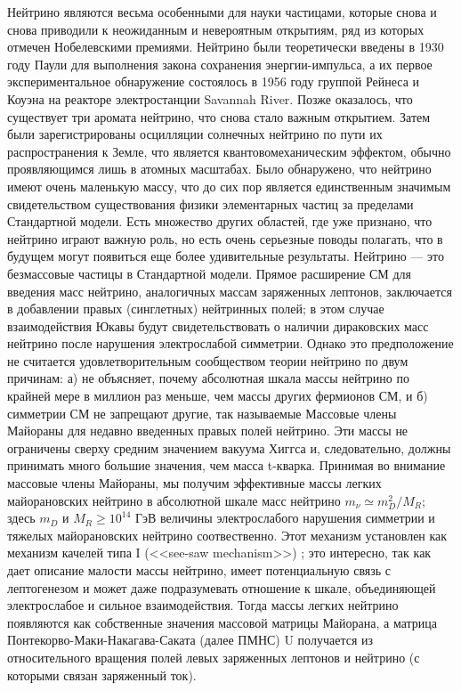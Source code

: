 ﻿\documentclass[a4paper,14pt]{extarticle}
\begin{document}
    Нейтрино являются весьма особенными для науки частицами, которые снова и снова 
    приводили к неожиданным и невероятным открытиям, ряд из которых отмечен Нобелевскими 
    премиями. Нейтрино были теоретически введены в 1930 году Паули для выполнения закона сохранения 
    энергии-импульса, а их первое экспериментальное обнаружение состоялось в 1956 году 
    группой Рейнеса и Коуэна на реакторе электростанции Savannah River. Позже оказалось, что существует три аромата нейтрино,
    что снова стало важным открытием. Затем были зарегистрированы осцилляции солнечных 
    нейтрино по пути их распространения к Земле, что является квантовомеханическим эффектом,
    обычно проявляющимся лишь в атомных масштабах. Было обнаружено, что нейтрино имеют 
    очень маленькую массу, что до сих пор является единственным значимым свидетельством
    существования физики элементарных частиц за пределами Стандартной модели. Есть множество других областей, где уже признано, 
    что нейтрино играют важную роль, но есть очень серьезные поводы полагать, что в будущем 
    могут появиться еще более удивительные результаты. Нейтрино — это безмассовые частицы в 
    Стандартной модели. Прямое расширение СМ для введения масс нейтрино, аналогичных массам 
    заряженных лептонов, заключается в добавлении правых (синглетных) нейтринных полей; в этом 
    случае  взаимодействия Юкавы будут свидетельствовать о наличии дираковских масс нейтрино 
    после нарушения электрослабой симметрии. Однако это предположение не считается удовлетворительным 
    сообществом теории нейтрино по двум причинам: а) не объясняет, почему абсолютная шкала 
    массы нейтрино по крайней мере в миллион раз меньше, чем массы других фермионов СМ, и 
    б) симметрии СМ не запрещают другие, так называемые Массовые члены Майораны для недавно 
    введенных правых полей нейтрино. Эти массы не ограничены сверху средним значением вакуума 
    Хиггса и, следовательно, должны принимать много большие значения, чем масса t-кварка. 
    Принимая во внимание массовые члены Майораны, мы получим эффективные массы легких майорановских 
    нейтрино в абсолютной шкале масс нейтрино $m_{\nu} \simeq m^2_D/M_R$; здесь $m_{D}$ и $M_R \geq 10^{14}$ ГэВ 
    величины электрослабого нарушения симметрии и тяжелых майорановских нейтрино соотвественно. 
    Этот механизм установлен как механизм качелей типа I (<<see-saw mechanism>>) \cite{minkowski} 
    \cite{https://doi.org/10.48550/arxiv.1306.4669}; это интересно, так как дает описание 
    малости массы нейтрино, имеет потенциальную связь с лептогенезом и может даже подразумевать 
    отношение к шкале, объединяющей электрослабое и сильное взаимодействия. Тогда массы легких 
    нейтрино появляются как собственные значения массовой матрицы Майорана, а матрица 
    Понтекорво-Маки-Накагава-Саката (далее ПМНС) U получается из относительного вращения полей 
    левых заряженных лептонов и нейтрино (с которыми связан заряженный ток).
    
\end{document}
